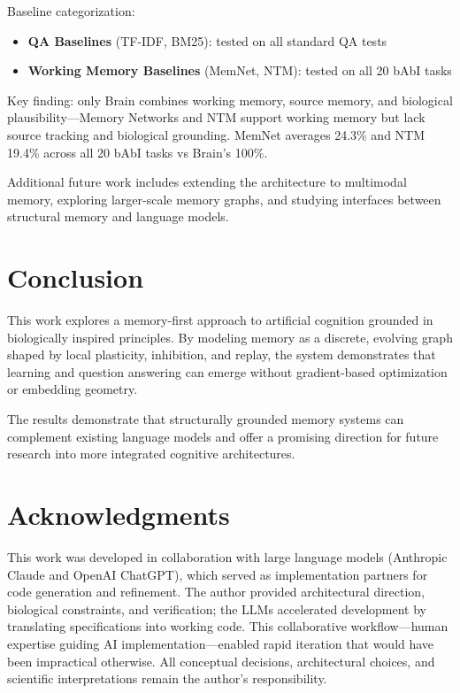 \documentclass[11pt]{article}
\begin{document}
Baseline categorization:
\begin{itemize}
  \item \textbf{QA Baselines} (TF-IDF, BM25): tested on all standard QA tests
  \item \textbf{Working Memory Baselines} (MemNet, NTM): tested on all 20 bAbI tasks
\end{itemize}

Key finding: only Brain combines working memory, source memory, and biological 
plausibility---Memory Networks and NTM support working memory but lack source tracking 
and biological grounding. MemNet averages 24.3\% and NTM 19.4\% across all 20 bAbI tasks 
vs Brain's 100\%.

Additional future work includes extending the architecture to multimodal memory, exploring
larger-scale memory graphs, and studying interfaces between structural memory and language
models.

\section{Conclusion}

This work explores a memory-first approach to artificial cognition grounded in
biologically inspired principles. By modeling memory as a discrete, evolving
graph shaped by local plasticity, inhibition, and replay, the system demonstrates
that learning and question answering can emerge without gradient-based
optimization or embedding geometry.

The results demonstrate that structurally grounded memory systems can complement existing language models and offer a promising direction for future research into more integrated cognitive architectures.

\section*{Acknowledgments}

This work was developed in collaboration with large language models (Anthropic Claude and OpenAI ChatGPT), which served as implementation partners for code generation and refinement. The author provided architectural direction, biological constraints, and verification; the LLMs accelerated development by translating specifications into working code. This collaborative workflow---human expertise guiding AI implementation---enabled rapid iteration that would have been impractical otherwise. All conceptual decisions, architectural choices, and scientific interpretations remain the author's responsibility.



\end{document}
